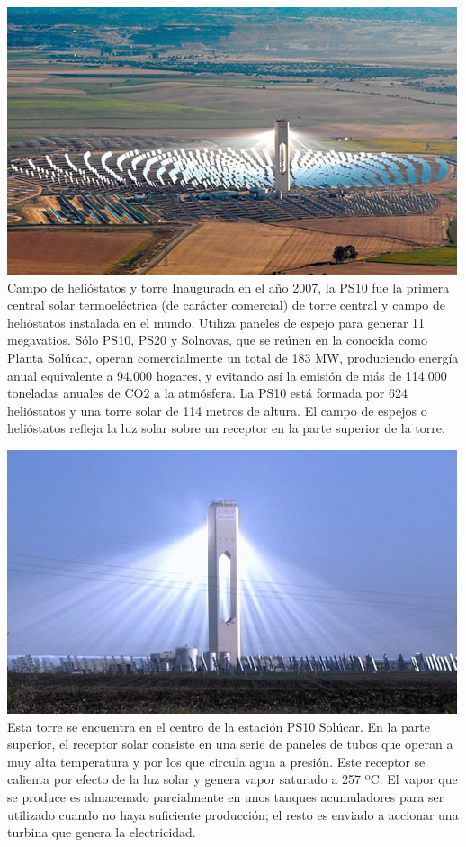 \documentclass[12pt]{article}
\begin{document}
\includegraphics[width=\textwidth]{unnamed (3).jpg}
Campo de helióstatos y torre
Inaugurada en el año 2007, la PS10 fue la primera central solar termoeléctrica (de carácter comercial) de torre central y campo de helióstatos instalada en el mundo. Utiliza paneles de espejo para generar 11 megavatios.
Sólo PS10, PS20 y Solnovas, que se reúnen en la conocida como Planta Solúcar, operan comercialmente un total de 183 MW, produciendo energía anual equivalente a 94.000 hogares, y evitando así la emisión de más de 114.000 toneladas anuales de CO2 a la atmósfera.
La PS10 está formada por 624 helióstatos y una torre solar de 114 metros de altura. El campo de espejos o helióstatos refleja la luz solar sobre un receptor en la parte superior de la torre.

\includegraphics[width=\textwidth]{unnamed (5).jpg}
Esta torre se encuentra en el centro de la estación PS10 Solúcar. En la parte superior, el receptor solar consiste en una serie de paneles de tubos que operan a muy alta temperatura y por los que circula agua a presión. Este receptor se calienta por efecto de la luz solar y genera vapor saturado a 257 ºC. El vapor que se produce es almacenado parcialmente en unos tanques acumuladores para ser utilizado cuando no haya suficiente producción; el resto es enviado a accionar una turbina que genera la electricidad.
\end{document}
